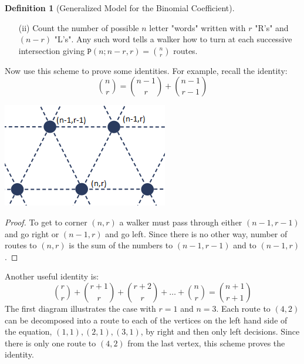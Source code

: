 \documentclass[12pt, letterpaper, onecolumn, conference, final]{IEEEtran}
\theoremstyle{definition}
\newtheorem{definition}{Definition}[section]
\theoremstyle{plain}
\begin{document}
\begin{center}
{\begin{minipage}{7.3 in}
\begin{definition}[Generalized Model for the Binomial Coefficient]
\begin{itemize}
\vspace{.2cm}
\item[(ii)]
Count the number of possible $n$ letter "words" written with $r$ "R's" and $(n-r)$ "L's". Any such word tells a walker how to turn at each successive intersection giving $\mathtt{P}(n;n-r,r) = {n \choose r}$ routes.

\end{itemize}
\vspace{.3cm}
Now use this scheme to prove some identities. For example, recall the identity:
\begin{equation*}
{n \choose r} = {n-1 \choose r} + {n-1 \choose r-1}
\end{equation*}
\begin{center}
\includegraphics[scale=.2]{img/BC_Identity_Visualization.png}
\end{center}
\begin{proof}
To get to corner $(n,r)$ a walker must pass through either $(n-1,r-1)$ and go right or $(n-1,r)$ and go left. Since there is no other way, number of routes to $(n,r)$ is the sum of the numbers to $(n-1,r-1)$ and to $(n-1,r)$.
\end{proof}
Another useful identity is:
\begin{equation*}
{r \choose r} + {r+1 \choose r} + {r+2 \choose r} + \dots + {n \choose r} = {n+1 \choose r+1}
\end{equation*}
The first diagram illustrates the case with $r=1$ and $n=3$. Each route to $(4,2)$ can be decomposed into a route to each of the vertices on the left hand side of the equation, $(1,1), (2,1), (3,1)$, by right and then only left decisions. Since there is only one route to $(4,2)$ from the last vertex, this scheme proves the identity.
\end{definition}
\end{minipage}}
\end{center}
\end{document}
